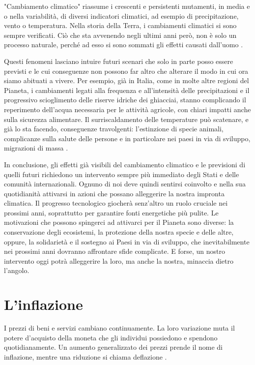 "Cambiamento climatico" riassume i crescenti e persistenti mutamenti, in media e o nella variabilità, di diversi indicatori climatici, ad esempio di precipitazione, vento o temperatura. Nella storia della Terra, i cambiamenti climatici si sono sempre verificati. Ciò che sta avvenendo negli ultimi anni però, non è solo un processo naturale, perché ad esso si sono sommati gli effetti causati dall'uomo \parencite{IPCC:2014}.

Questi fenomeni lasciano intuire futuri scenari che solo in parte posso essere previsti e le cui conseguenze non possono far altro che alterare il modo in cui ora siamo abituati a vivere. Per esempio, già in Italia, come in molte altre regioni del Pianeta, i cambiamenti legati alla frequenza e all'intensità delle precipitazioni e il progressivo scioglimento delle riserve idriche dei ghiacciai, stanno complicando il reperimento dell'acqua necessaria per le attività agricole, con chiari impatti anche sulla sicurezza alimentare. Il surriscaldamento delle temperature può scatenare, e già lo sta facendo, conseguenze travolgenti: l'estinzione di specie animali, complicanze sulla salute delle persone e in particolare nei paesi in via di sviluppo, migrazioni di massa \parencite{IPCC:2014}.

In conclusione, gli effetti già visibili del cambiamento climatico e le previsioni di quelli futuri richiedono un intervento sempre più immediato degli Stati e delle comunità internazionali. Ognuno di noi deve quindi sentirsi coinvolto e nella sua quotidianità attivarsi in azioni che possano alleggerire la nostra impronta climatica. Il progresso tecnologico giocherà senz'altro un ruolo cruciale nei prossimi anni, soprattutto per garantire fonti energetiche più pulite. Le motivazioni che possono spingerci ad attivarci per il Pianeta sono diverse: la conservazione degli ecosistemi, la protezione della nostra specie e delle altre, oppure, la solidarietà e il sostegno ai Paesi in via di sviluppo, che inevitabilmente nei prossimi anni dovranno affrontare sfide complicate. E forse, un nostro intervento oggi potrà alleggerire la loro, ma anche la nostra, minaccia dietro l'angolo.

\section{L'inflazione}

I prezzi di beni e servizi cambiano continuamente. La loro variazione muta il potere d'acquisto della moneta che gli individui possiedono e spendono quotidianamente. Un aumento generalizzato dei prezzi prende il nome di inflazione, mentre una riduzione si chiama deflazione \parencite{ECB:inflation_def}.

